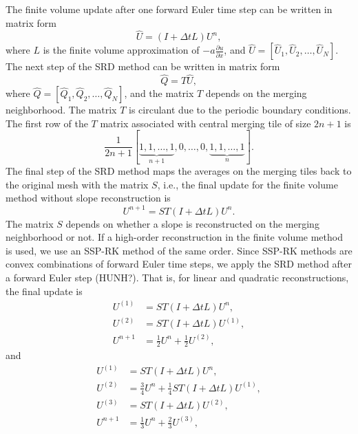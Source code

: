 The finite volume update after one forward Euler time step can be written in 
matrix form
\begin{equation}\label{eq:L}
    \hat U = (I + \Delta t L)U^n,
\end{equation}
where $L$ is the finite volume approximation of $-a\frac{\partial u}{\partial x}$, and $\hat U = [\hat U_1, \hat U_2, \hdots, \hat U_N]$.
The next step of the SRD method can be written in matrix form
\begin{equation}\label{eq:merged_tile}
\hat Q = T\hat U,
\end{equation}
where $\hat Q = [\hat Q_1, \hat Q_2, \hdots, \hat Q_N]$, and the 
matrix $T$ depends on the merging neighborhood.  The matrix $T$ is circulant 
due to the periodic boundary conditions.  
The first row of the $T$ matrix associated with central merging tile of 
size $2n+1$ is
$$
\frac{1}{2n+1}[\underbrace{1, 1, \hdots,1}_{n+1}, 0, \hdots, 0,\underbrace{1, 1, \hdots, 1}_{n}].
$$
The final step of the SRD method maps the averages on the merging tiles back to the original mesh with the matrix $S$, i.e.,
the final update for the finite volume method without slope reconstruction is
$$
U^{n+1} = ST(I + \Delta t L)U^n.
$$
The matrix $S$ depends on whether a slope is reconstructed on the merging neighborhood or not.  
If a high-order reconstruction in the finite volume method is used, 
we use an SSP-RK method of the same order.  Since SSP-RK methods are 
convex combinations of forward Euler time steps, we apply the SRD method 
after a forward Euler step (HUNH?).  That is, for linear and quadratic reconstructions, the final update is
\begin{equation}
\begin{aligned}
    U^{(1)} &= ST(I + \Delta t L)U^n, \\
    U^{(2)} &= ST(I + \Delta t L)U^{(1)},\\
    U^{n+1} &= \frac{1}{2}U^n + \frac{1}{2}U^{(2)},
\end{aligned}
\end{equation}
and 
\begin{equation}
\begin{aligned}
    U^{(1)} &= ST(I + \Delta t L)U^n, \\
    U^{(2)} &=  \frac{3}{4}U^n + \frac{1}{4}ST(I+\Delta t L)U^{(1)} ,\\
    U^{(3)} &= ST(I+\Delta t L)U^{(2)}, \\
    U^{n+1} &= \frac{1}{3}U^n + \frac{2}{3}U^{(3)},
\end{aligned}
\end{equation}
